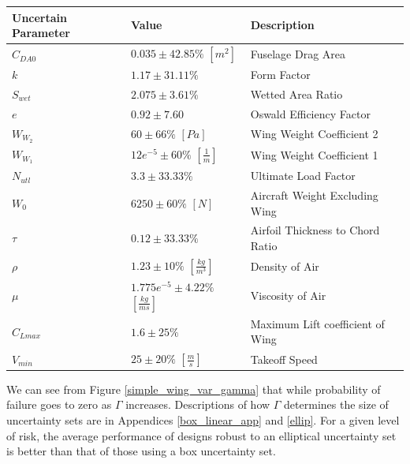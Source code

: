 \begin{center}
\begin{tabular}{ |P{7em}|P{3.5cm}|P{5.2cm}|}
\hline
Uncertain Parameter & Value & Description \\
\hline
$C_{DA0}$ & $0.035 \pm 42.85\%$ $[m^2]$ & Fuselage Drag Area\\
\hline
$k$ & $1.17 \pm 31.11\%$ & Form Factor \\
\hline
$S_{wet}$ & $2.075 \pm 3.61\%$ & Wetted Area Ratio\\  
\hline
$e$ & $0.92 \pm 7.60$ & Oswald Efficiency Factor\\  
\hline
$W_{W_2}$ & $60 \pm 66\%$ $[Pa]$ & Wing Weight Coefficient 2\\  
\hline
$W_{W_1}$ & $12e^{-5} \pm 60\%$ $[\frac{1}{m}]$ & Wing Weight Coefficient 1\\  
\hline
$N_{utl}$ & $3.3 \pm 33.33\%$ & Ultimate Load Factor\\  
\hline
$W_0$ & $6250 \pm 60\%$ $[N]$ & Aircraft Weight Excluding Wing\\  
\hline
$\tau$ & $0.12 \pm 33.33\%$ & Airfoil Thickness to Chord Ratio\\  
\hline
$\rho$ & $1.23 \pm 10\%$ $[\frac{kg}{m^3}]$ & Density of Air\\  
\hline
$\mu$ & $1.775e^{-5} \pm 4.22\%$ $[\frac{kg}{ms}]$ & Viscosity of Air\\  
\hline
$C_{Lmax}$ & $1.6 \pm 25\%$ & Maximum Lift coefficient of Wing\\  
\hline
$V_{min}$ & $25 \pm 20\%$ $[\frac{m}{s}]$ & Takeoff Speed\\  
\hline
\end{tabular}
\label{uncertain_simple_wing}
\end{center}

We can see from Figure \ref{simple_wing_var_gamma} that while probability of failure goes to zero as $\Gamma$ increases. Descriptions of how $\Gamma$ determines the size of uncertainty sets are in Appendices \ref{box_linear_app} and \ref{ellip}. For a given level of risk, the average performance of designs robust to an elliptical uncertainty set is better than that of those using a box uncertainty set.

